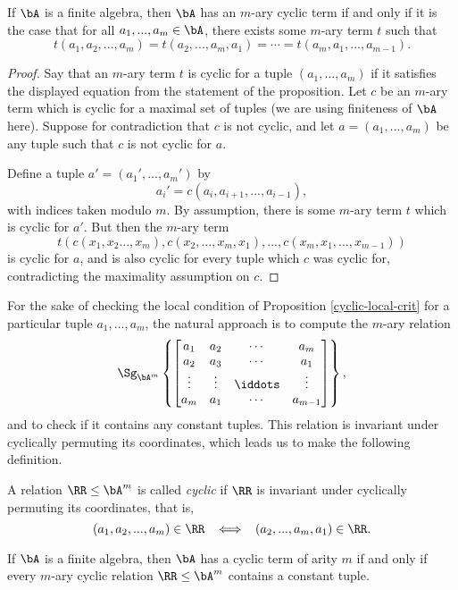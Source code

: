 \begin{prop}\label{cyclic-local-crit} If $\bA$ is a finite algebra, then $\bA$ has an $m$-ary cyclic term if and only if it is the case that for all $a_1, ..., a_m \in \bA$, there exists some $m$-ary term $t$ such that
\[
t(a_1, a_2, ..., a_m) = t(a_2, ..., a_m, a_1) = \cdots = t(a_m, a_1, ..., a_{m-1}).
\]
\end{prop}
\begin{proof} Say that an $m$-ary term $t$ is cyclic for a tuple $(a_1, ..., a_m)$ if it satisfies the displayed equation from the statement of the proposition. Let $c$ be an $m$-ary term which is cyclic for a maximal set of tuples (we are using finiteness of $\bA$ here). Suppose for contradiction that $c$ is not cyclic, and let $a = (a_1, ..., a_m)$ be any tuple such that $c$ is not cyclic for $a$.

Define a tuple $a' = (a_1', ..., a_m')$ by
\[
a_i' = c(a_i, a_{i+1}, ..., a_{i-1}),
\]
with indices taken modulo $m$. By assumption, there is some $m$-ary term $t$ which is cyclic for $a'$. But then the $m$-ary term
\[
t(c(x_1, x_2 ..., x_m), c(x_2, ..., x_m, x_1), ..., c(x_m, x_1, ..., x_{m-1}))
\]
is cyclic for $a$, and is also cyclic for every tuple which $c$ was cyclic for, contradicting the maximality assumption on $c$.
\end{proof}

For the sake of checking the local condition of Proposition \ref{cyclic-local-crit} for a particular tuple $a_1, ..., a_m$, the natural approach is to compute the $m$-ary relation
\[
\Sg_{\bA^m}\left\{\begin{bmatrix} a_1 & a_2 & \cdots & a_m\\ a_2 & a_3 & \cdots & a_1\\ \vdots & \vdots & \iddots & \vdots\\ a_m & a_1 & \cdots & a_{m-1}\end{bmatrix}\right\},
\]
and to check if it contains any constant tuples. This relation is invariant under cyclically permuting its coordinates, which leads us to make the following definition.

\begin{defn} A relation $\RR \le \bA^m$ is called \emph{cyclic} if $\RR$ is invariant under cyclically permuting its coordinates, that is,
\[
(a_1, a_2, ..., a_m) \in \RR \;\; \iff \;\; (a_2, ..., a_m, a_1) \in \RR.
\]
\end{defn}

\begin{cor} If $\bA$ is a finite algebra, then $\bA$ has a cyclic term of arity $m$ if and only if every $m$-ary cyclic relation $\RR \le \bA^m$ contains a constant tuple.
\end{cor}

